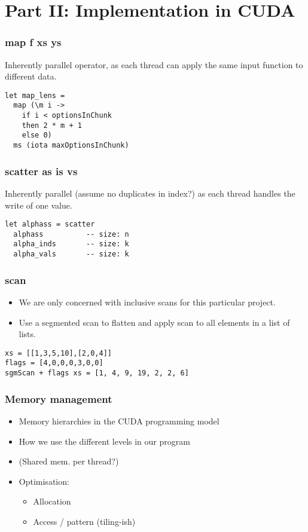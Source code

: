 \section{Part II: Implementation in CUDA}

\begin{frame}[fragile]
  \frametitle{map f xs ys}
%
Inherently parallel operator, as each thread can apply the same input
function to different data.
%
\begin{lstlisting}
let map_lens =
  map (\m i ->
    if i < optionsInChunk
    then 2 * m + 1
    else 0)
  ms (iota maxOptionsInChunk)
\end{lstlisting}
%
\end{frame}

\begin{frame}[fragile]
  \frametitle{scatter as is vs}
%
Inherently parallel (assume no duplicates in index?) as each thread
handles the write of one value.
%
%
\begin{lstlisting}
let alphass = scatter
  alphass          -- size: n
  alpha_inds       -- size: k
  alpha_vals       -- size: k
\end{lstlisting}
%
\end{frame}

\begin{frame}[fragile]
  \frametitle{scan}
%
\begin{itemize}
  \item We are only concerned with inclusive scans for this particular project.
  \item Use a segmented scan to flatten and apply scan to all elements in a list of lists.
\end{itemize}
%
%
\begin{lstlisting}
xs = [[1,3,5,10],[2,0,4]]
flags = [4,0,0,0,3,0,0]
sgmScan + flags xs = [1, 4, 9, 19, 2, 2, 6]
\end{lstlisting}
\end{frame}

\begin{frame}
  \frametitle{Memory management}
  \begin{itemize}
    \item Memory hierarchies in the CUDA programming model
    \item How we use the different levels in our program
    \item (Shared mem. per thread?)
    \item Optimisation:
      \begin{itemize}
        \item Allocation
        \item Access / pattern (tiling-ish)
      \end{itemize}
  \end{itemize}
\end{frame}
